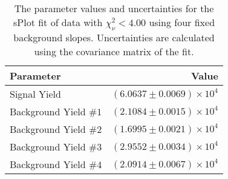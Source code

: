 
\begin{table}[ht]
    \begin{center}
        \begin{tabular}{lr}\toprule
            Parameter & Value \\\midrule
            Signal Yield & $(6.0637 \pm 0.0069) \times 10^{4}$ \\
            Background Yield $\#1$ & $(2.1084 \pm 0.0015) \times 10^{4}$ \\
            Background Yield $\#2$ & $(1.6995 \pm 0.0021) \times 10^{4}$ \\
            Background Yield $\#3$ & $(2.9552 \pm 0.0034) \times 10^{4}$ \\
            Background Yield $\#4$ & $(2.0914 \pm 0.0067) \times 10^{4}$ \\\bottomrule
        \end{tabular}
        \caption{The parameter values and uncertainties for the sPlot fit of data with $\chi^2_\nu < 4.00$ using four fixed background slopes. Uncertainties are calculated using the covariance matrix of the fit.}\label{tab:splot-fit-results-chisqdof-4.00-fixed-4}
    \end{center}
\end{table}
